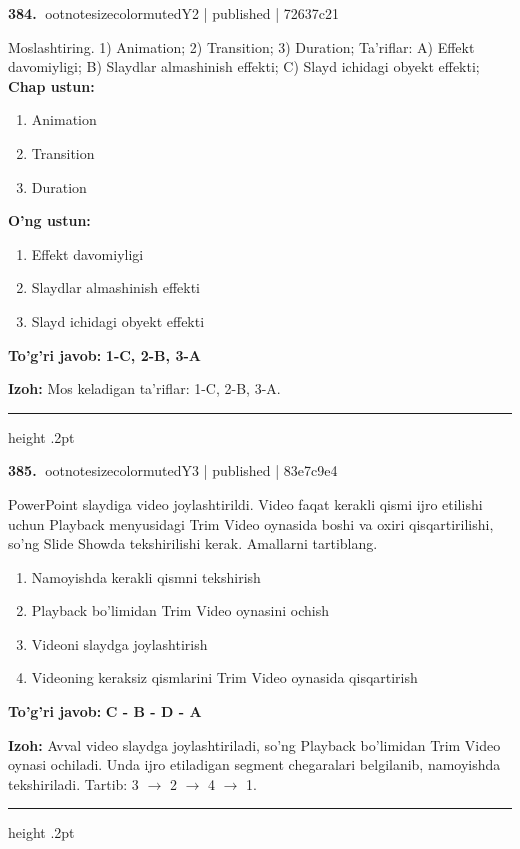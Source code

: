 \documentclass[10pt,a4paper]{article}
\begin{document}
\textbf{\color{ink}384.} {ootnotesizecolor{muted}Y2 | published | 72637c21}
\par
Moslashtiring.  1) Animation;  2) Transition;  3) Duration;  Ta'riflar: A) Effekt davomiyligi;  B) Slaydlar almashinish effekti;  C) Slayd ichidagi obyekt effekti;
\textbf{Chap ustun:}\begin{enumerate}[label=\arabic*),leftmargin=9mm]
\item Animation
\item Transition
\item Duration
\end{enumerate}
\textbf{O'ng ustun:}\begin{enumerate}[label=\Alph*),leftmargin=9mm]
\item Effekt davomiyligi
\item Slaydlar almashinish effekti
\item Slayd ichidagi obyekt effekti
\end{enumerate}
\begin{tcolorbox}[enhanced,breakable,colback=teal!4,colframe=teal!55!black,boxrule=0.45pt,arc=1.2mm,left=2.8mm,right=2.8mm,top=2mm,bottom=2mm]
\textbf{\color{teal}To'g'ri javob:} \textbf{1-C, 2-B, 3-A}
\par\smallskip
\textbf{Izoh:} Mos keladigan ta'riflar: 1-C, 2-B, 3-A.
\end{tcolorbox}
\vspace{2mm}\hrule height .2pt\vspace{2mm}

\textbf{\color{ink}385.} {ootnotesizecolor{muted}Y3 | published | 83e7c9e4}
\par
PowerPoint slaydiga video joylashtirildi. Video faqat kerakli qismi ijro etilishi uchun Playback menyusidagi Trim Video oynasida boshi va oxiri qisqartirilishi, so'ng Slide Showda tekshirilishi kerak. Amallarni tartiblang.
\begin{enumerate}[label=\Alph*),leftmargin=9mm]
\item Namoyishda kerakli qismni tekshirish
\item Playback bo'limidan Trim Video oynasini ochish
\item Videoni slaydga joylashtirish
\item Videoning keraksiz qismlarini Trim Video oynasida qisqartirish
\end{enumerate}
\begin{tcolorbox}[enhanced,breakable,colback=teal!4,colframe=teal!55!black,boxrule=0.45pt,arc=1.2mm,left=2.8mm,right=2.8mm,top=2mm,bottom=2mm]
\textbf{\color{teal}To'g'ri javob:} \textbf{C - B - D - A}
\par\smallskip
\textbf{Izoh:} Avval video slaydga joylashtiriladi, so'ng Playback bo'limidan Trim Video oynasi ochiladi. Unda ijro etiladigan segment chegaralari belgilanib, namoyishda tekshiriladi. Tartib: 3 \ensuremath{\rightarrow} 2 \ensuremath{\rightarrow} 4 \ensuremath{\rightarrow} 1.
\end{tcolorbox}
\vspace{2mm}\hrule height .2pt\vspace{2mm}
\end{document}
